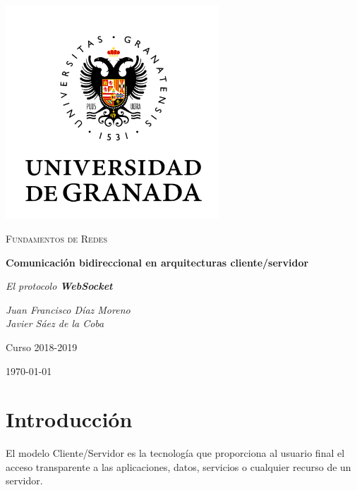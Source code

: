 \documentclass[12pt,a4paper]{article}
\begin{document}
\begin{titlepage}
  \centering
  \includegraphics[width=0.6\textwidth]{imagenes/ugr.png}\par\vspace{1cm}
  {\scshape\large Fundamentos de Redes \par} \vspace{1cm}
  {\huge\bfseries Comunicación bidireccional en arquitecturas cliente/servidor \par}
  \vspace{0.4cm}
  {\large\itshape El protocolo \textbf{WebSocket}\\}
  \vspace{0.6cm}
  {\large\itshape  Juan Francisco Díaz Moreno \\ Javier Sáez de la Coba \par} \vspace{1.00cm}
  Curso 2018-2019 \\
  \vfill

  {\large \today\par}
\end{titlepage}

\tableofcontents
\newpage

\setlength{\parskip}{10pt}

\section{Introducción}


El modelo Cliente/Servidor es la tecnología que proporciona al usuario final el acceso transparente a las aplicaciones, datos, servicios o cualquier recurso de un servidor.
\end{document}
